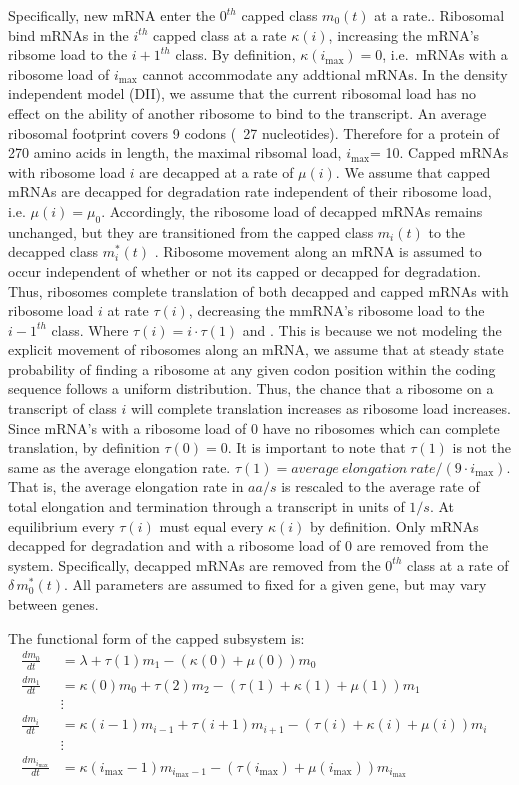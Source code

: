 \documentclass[review]{elsarticle}
\newcommand{\imax}{\ensuremath{i_{\max}}\xspace}
\begin{document}
Specifically, new mRNA enter the $0^{th}$ capped class $m_0(t)$ at a rate..
Ribosomal bind mRNAs in the $i^{th}$ capped class at a rate $\kappa(i)$, increasing the mRNA's ribsome load to the $i+1^{th}$ class.
By definition, $\kappa(\imax)= 0$, i.e.~mRNAs with a ribosome load of \imax cannot accommodate any addtional mRNAs.
In the density independent model (DII), we assume that the current ribosomal load has no effect on the ability of another ribosome to bind to the transcript. 
An average ribosomal footprint covers 9 codons (~27 nucleotides). Therefore for a protein of 270 amino acids in length, the maximal ribsomal load, \imax = 10.
Capped mRNAs with ribosome load $i$ are decapped at a rate of $\mu(i)$.
We assume that capped mRNAs are decapped for degradation rate independent of their ribosome load, i.e. $\mu(i)=\mu_0$.
Accordingly, the ribosome load of decapped mRNAs remains unchanged, but they are transitioned from the capped class $m_i(t)$ to the decapped class $m_i^*(t)$ .
Ribosome movement along an mRNA is assumed to occur independent of whether or not its capped or decapped for degradation.
Thus, ribosomes complete translation of both decapped and capped mRNAs with ribosome load $i$ at rate $\tau(i)$, decreasing the mmRNA's ribosome load to the $i-1^{th}$ class. %
Where $\tau(i)= i \cdot \tau(1)$ and .
This is because we not modeling the explicit movement of ribosomes along an mRNA, we assume that at steady state probability of finding a ribosome at any given codon position within the coding sequence follows a uniform distribution.
Thus, the chance that a ribosome on a transcript of class $i$ will complete translation increases as ribosome load increases.  
Since mRNA's with a ribosome load of 0 have no ribosomes which can complete translation, by definition $\tau(0) = 0$.
It is important to note that $\tau(1)$ is not the same as the average elongation rate. $\tau(1) = average \: elongation \: rate/(9 \cdot \imax)$. 
That is, the average elongation rate in $aa/s$ is rescaled to the average rate of total elongation and termination through a transcript in units of $1/s$.
At equilibrium every $\tau(i)$ must equal every $\kappa(i)$ by definition.  
Only mRNAs decapped for degradation and with a ribosome load of 0 are removed from the system.
Specifically, decapped mRNAs are removed from the $0^{th}$ class at a rate of $\delta \, m^*_0(t)$.
All parameters are assumed to fixed for a given gene, but may vary between genes.


The functional form of the capped subsystem is:
\begin{align*}
\frac{dm_{0}}{dt} &= \lambda+\tau(1)m_{1}-\left(\kappa(0) + \mu(0)\right)m_{0} \\
\frac{dm_{1}}{dt} &= \kappa(0)m_{0}+\tau(2)m_{2}-\left(\tau(1)+\kappa(1)+\mu(1)\right) m_{1}\\
& \vdots & \\
\frac{dm_{i}}{dt} &= \kappa(i-1)m_{i-1}+\tau(i+1)m_{i+1}-\left(\tau(i)+\kappa(i)+\mu(i)\right) m_{i} \\
& \vdots & \\
\frac{dm_{\imax}}{dt} &= \kappa(\imax-1)m_{\imax-1}-\left(\tau(\imax)+\mu(\imax)\right) m_{\imax}\\
\end{align*}
\end{document}
